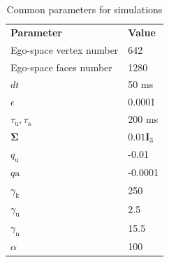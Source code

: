 \documentclass[letterpaper, 10 pt, conference]{ieeeconf}  %
\begin{document}
	\begin{table}[h!]
		\caption{Common parameters for simulations}
		\label{tab:params}
		\begin{center}
			\begin{tabular}{p{4.2cm} p{3.2cm}}
				\cellcolor{darkcyan!20}\textbf{Parameter} & \cellcolor{darkcyan!20}\textbf{Value} \\
				Ego-space vertex number & 642\\
				\cellcolor{gray!8}Ego-space faces number & \cellcolor{gray!8}1280 \\
				$dt$ & 50 ms\\
				\cellcolor{gray!8}$\epsilon$ & \cellcolor{gray!8}0.0001\\
				$\tau_{\mathrm{u}}, \tau_{\mathrm{a}}$ & 200 ms\\
				\cellcolor{gray!8}$\mathbf{\Sigma}$ & \cellcolor{gray!8}$0.01\mathbf{I}_3$ \\
				$q_\mathrm{u}$ & -0.01 \\
				\cellcolor{gray!8}$q\mathrm{a}$ & \cellcolor{gray!8}-0.0001 \\
				$\gamma_{\mathrm{k}}$ & 250\\
				\cellcolor{gray!8}$\gamma_\mathrm{u}$ & \cellcolor{gray!8}2.5\\
				$\gamma_\mathrm{n}$ & 15.5 \\
				\cellcolor{gray!8}$\alpha$ & \cellcolor{gray!8}100\\
			\end{tabular}
		\end{center}
	\end{table}
	
\end{document}
